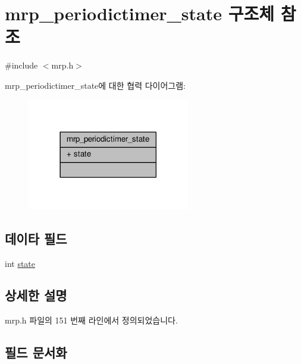 \hypertarget{structmrp__periodictimer__state}{}\section{mrp\+\_\+periodictimer\+\_\+state 구조체 참조}
\label{structmrp__periodictimer__state}


{\ttfamily \#include $<$mrp.\+h$>$}



mrp\+\_\+periodictimer\+\_\+state에 대한 협력 다이어그램\+:
\nopagebreak
\begin{figure}[H]
\begin{center}
\leavevmode
\includegraphics[width=201pt]{structmrp__periodictimer__state__coll__graph}
\end{center}
\end{figure}
\subsection*{데이타 필드}
\begin{DoxyCompactItemize}
\item 
int \hyperlink{structmrp__periodictimer__state_a89f234133d3efe315836311cbf21c64b}{state}
\end{DoxyCompactItemize}


\subsection{상세한 설명}


mrp.\+h 파일의 151 번째 라인에서 정의되었습니다.



\subsection{필드 문서화}
